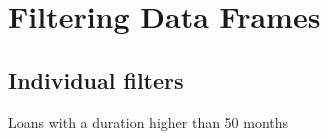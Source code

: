 \documentclass[
]{article}
\newenvironment{Shaded}{\begin{snugshade}}{\end{snugshade}}
\newcommand{\DecValTok}[1]{\textcolor[rgb]{0.00,0.00,0.81}{#1}}
\newcommand{\NormalTok}[1]{#1}
\newcommand{\OtherTok}[1]{\textcolor[rgb]{0.56,0.35,0.01}{#1}}
\newcommand{\SpecialCharTok}[1]{\textcolor[rgb]{0.00,0.00,0.00}{#1}}
\begin{document}
\hypertarget{filtering-data-frames}{%
\section{Filtering Data Frames}\label{filtering-data-frames}}

\hypertarget{individual-filters}{%
\subsection{Individual filters}\label{individual-filters}}

Loans with a duration higher than 50 months

\begin{Shaded}
\end{Shaded}
\end{document}
